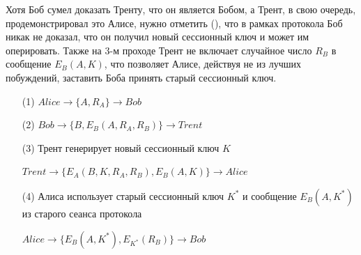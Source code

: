 Хотя Боб сумел доказать Тренту, что он является Бобом, а Трент, в свою очередь, продемонстрировал это Алисе, нужно отметить (\cite{Zhou:Yu:Pan:Wang:2016}), что в рамках протокола Боб никак не доказал, что он получил новый сессионный ключ и может им оперировать. Также на 3-м проходе Трент не включает случайное число $R_B$ в сообщение $E_B(A, K)$, что позволяет Алисе, действуя не из лучших побуждений, заставить Боба принять старый сессионный ключ.

\begin{itemize}
	\item[(1)] $Alice \to \{ A, R_A \} \to Bob$
	\item[(2)] $Bob \to \{ B, E_B( A, R_A, R_B ) \} \to Trent$
	\item[(3)] Трент генерирует новый сессионный ключ $K$
	\item[{}] $Trent \to \{ E_A( B, K, R_A, R_B ), E_B(A, K) \} \to Alice$
	\item[(4)] Алиса использует старый сессионный ключ $K^*$ и сообщение $E_B( A, K^* )$ из старого сеанса протокола
	\item[{}] $Alice \to \{ E_B( A, K^* ), E_{K^*}( R_B ) \} \to Bob$
\end{itemize}

